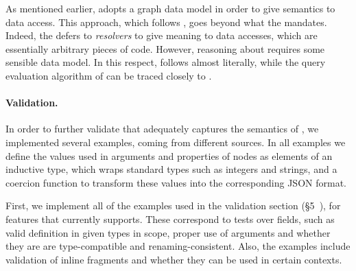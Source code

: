 As mentioned earlier, \gcoql adopts a graph data model in order to give semantics to data access. This approach, which follows \HP, goes beyond what the \spec mandates. Indeed, the \spec defers to {\em resolvers} to give meaning to data accesses, which are essentially arbitrary pieces of code. However, reasoning about \gql requires some sensible data model. In this respect, \gcoql follows \HP almost literally, while the query evaluation algorithm of \gcoql can be traced closely to \spec.





\paragraph{Validation.}

In order to further validate that \gcoql adequately captures the semantics of \gql, we implemented several examples, coming from different sources. 
In all examples we define the values used in arguments and properties of nodes as elements of an inductive type, which wraps standard \coq types such as integers and strings, 
and a coercion function to transform these values into the corresponding JSON format.


First, we implement all of the examples used in the \spec validation section (\cf\S5~\cite{gqlspec}), for features that \gcoql currently supports.
These correspond to tests over fields, such as valid definition in given types in scope, proper use of arguments and 
whether they are are type-compatible and renaming-consistent. Also, the examples include validation of inline fragments and 
whether they can be used in certain contexts. 

